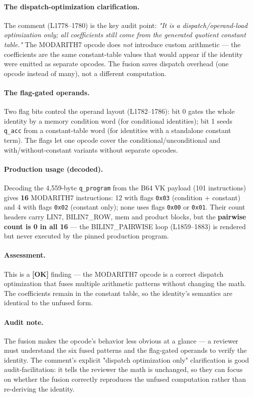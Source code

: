 \paragraph{The dispatch-optimization clarification.} The comment
(L1778--1780) is the key audit point: \emph{"It is a
dispatch/operand-load optimization only; all coefficients still
come from the generated quotient constant table."} The MODARITH7
opcode does \emph{not} introduce custom arithmetic --- the
coefficients are the same constant-table values that would appear
if the identity were emitted as separate opcodes. The fusion
saves dispatch overhead (one opcode instead of many), not a
different computation.

\paragraph{The flag-gated operands.} Two flag bits control the
operand layout (L1782--1786): bit 0 gates the whole identity by a
memory condition word (for conditional identities); bit 1 seeds
\texttt{q\_acc} from a constant-table word (for identities with a
standalone constant term). The flags let one opcode cover the
conditional/unconditional and with/without-constant variants
without separate opcodes.

\paragraph{Production usage (decoded).} Decoding the 4,559-byte
\texttt{q\_program} from the B64 VK payload (101 instructions)
gives \textbf{16} MODARITH7 instructions: 12 with flags
\texttt{0x03} (condition + constant) and 4 with flags
\texttt{0x02} (constant only); none uses flags \texttt{0x00} or
\texttt{0x01}. Their count headers carry LIN7, BILIN7\_ROW, mem
and product blocks, but the \textbf{pairwise count is 0 in all 16}
--- the BILIN7\_PAIRWISE loop (L1859--1883) is rendered but never
executed by the pinned production program.

\paragraph{Assessment.} This is a
\textcolor{tracegreen}{\textbf{[OK]}} finding --- the MODARITH7
opcode is a correct dispatch optimization that fuses multiple
arithmetic patterns without changing the math. The coefficients
remain in the constant table, so the identity's semantics are
identical to the unfused form.

\paragraph{Audit note.} The fusion makes the opcode's behavior
less obvious at a glance --- a reviewer must understand the six
fused patterns and the flag-gated operands to verify the
identity. The comment's explicit "dispatch optimization only"
clarification is good audit-facilitation: it tells the reviewer
the math is unchanged, so they can focus on whether the fusion
correctly reproduces the unfused computation rather than
re-deriving the identity.


